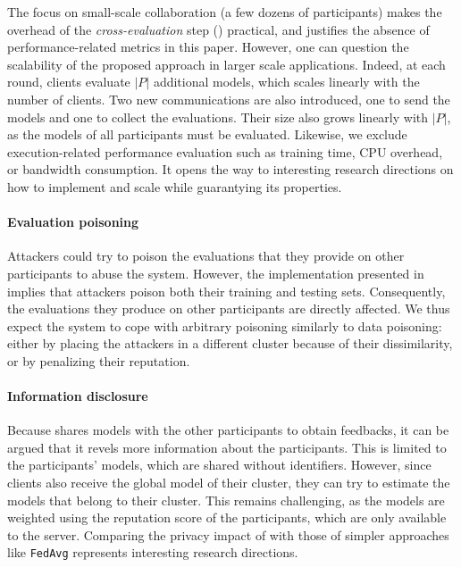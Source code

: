The focus on small-scale collaboration (\ie a few dozens of participants) makes the overhead of the \emph{cross-evaluation} step () practical, and justifies the absence of performance-related metrics in this paper.
However, one can question the scalability of the proposed approach in larger scale applications.
Indeed, at each round, clients evaluate $|P|$ additional models, which scales linearly with the number of clients.
Two new communications are also introduced, one to send the models and one to collect the evaluations.
Their size also grows linearly with $|P|$, as the models of all participants must be evaluated.
Likewise, we exclude execution-related performance evaluation such as training time, CPU overhead, or bandwidth consumption.
It opens the way to interesting research directions on how to implement and scale \thecontrib while guarantying its properties.


\paragraph{Evaluation poisoning}

Attackers could try to poison the evaluations that they provide on other participants to abuse the system.
However, the implementation presented in  implies that attackers poison both their training and testing sets.
Consequently, the evaluations they produce on other participants are directly affected.
We thus expect the system to cope with arbitrary poisoning similarly to data poisoning: either by placing the attackers in a different cluster because of their dissimilarity, or by penalizing their reputation. 


\paragraph{Information disclosure}

Because \thecontrib shares models with the other participants to obtain feedbacks, it can be argued that it revels more information about the participants.
This is limited to the participants' models, which are shared without identifiers.
However, since clients also receive the global model of their cluster, they can try to estimate the models that belong to their cluster.
This remains challenging, as the models are weighted using the reputation score of the participants, which are only available to the server.
Comparing the privacy impact of \thecontrib with those of simpler approaches like \texttt{FedAvg} represents interesting research directions.
